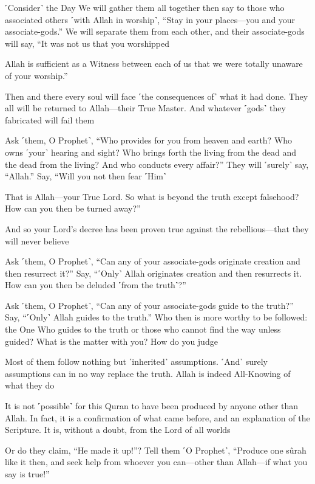 ˹Consider˺ the Day We will gather them all together then say to those who associated others ˹with Allah in worship˺, “Stay in your places—you and your associate-gods.” We will separate them from each other, and their associate-gods will say, “It was not us that you worshipped

Allah is sufficient as a Witness between each of us that we were totally unaware of your worship.”

Then and there every soul will face ˹the consequences of˺ what it had done. They all will be returned to Allah—their True Master. And whatever ˹gods˺ they fabricated will fail them

Ask ˹them, O Prophet˺, “Who provides for you from heaven and earth? Who owns ˹your˺ hearing and sight? Who brings forth the living from the dead and the dead from the living? And who conducts every affair?” They will ˹surely˺ say, “Allah.” Say, “Will you not then fear ˹Him˺

That is Allah—your True Lord. So what is beyond the truth except falsehood? How can you then be turned away?”

And so your Lord’s decree has been proven true against the rebellious—that they will never believe

Ask ˹them, O Prophet˺, “Can any of your associate-gods originate creation and then resurrect it?” Say, “˹Only˺ Allah originates creation and then resurrects it. How can you then be deluded ˹from the truth˺?”

Ask ˹them, O Prophet˺, “Can any of your associate-gods guide to the truth?” Say, “˹Only˺ Allah guides to the truth.” Who then is more worthy to be followed: the One Who guides to the truth or those who cannot find the way unless guided? What is the matter with you? How do you judge

Most of them follow nothing but ˹inherited˺ assumptions. ˹And˺ surely assumptions can in no way replace the truth. Allah is indeed All-Knowing of what they do

It is not ˹possible˺ for this Quran to have been produced by anyone other than Allah. In fact, it is a confirmation of what came before, and an explanation of the Scripture. It is, without a doubt, from the Lord of all worlds

Or do they claim, “He made it up!”? Tell them ˹O Prophet˺, “Produce one sûrah like it then, and seek help from whoever you can—other than Allah—if what you say is true!”

